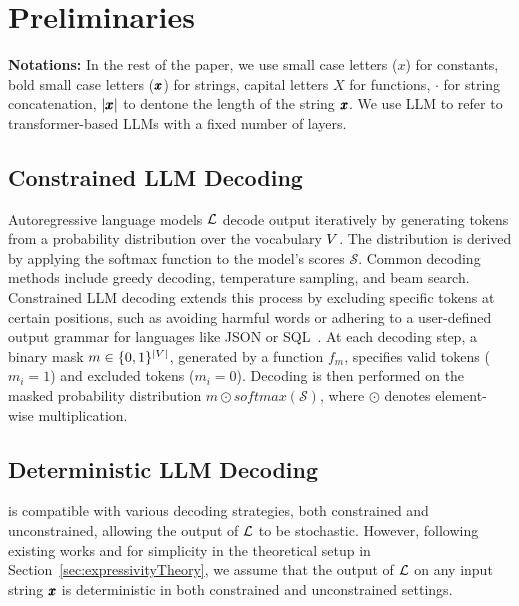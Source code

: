 \vspace{-9pt}
\section{Preliminaries}
\label{sec:prelims}
\textbf{Notations:} In the rest of the paper, we use small case letters ($x$) for constants, bold small case letters ($\pmb{x}$) for strings, capital letters $X$ for functions, $\cdot$ for string concatenation, $|\pmb{x}|$ to dentone the length of the string $\pmb{x}$. 
We use LLM to refer to transformer-based LLMs with a fixed number of layers. 
\subsection{Constrained LLM Decoding}
Autoregressive language models $\mathcal{L}{}$ decode output iteratively by generating tokens from a probability distribution over the vocabulary $V$. The distribution is derived by applying the softmax function to the model's scores $\mathcal{S}$. 
Common decoding methods include greedy decoding, temperature sampling, and beam search.
Constrained LLM decoding extends this process by excluding specific tokens at certain positions, such as avoiding harmful words or adhering to a user-defined output grammar for languages like JSON or SQL~\cite{poesia2022synchromesh, ugare2024syncodellmgenerationgrammar, willard2023efficient}. 
At each decoding step, a binary mask $m \in \{0, 1\}^{|V|}$, generated by a function $f_m$, specifies valid tokens ($m_i = 1$) and excluded tokens ($m_i = 0$). 
Decoding is then performed on the masked probability distribution $m \odot \textit{softmax}(\mathcal{S})$, where $\odot$ denotes element-wise multiplication. 

\subsection{Deterministic LLM Decoding}
\Tool is compatible with various decoding strategies, both constrained and unconstrained, allowing the output of \(\mathcal{L}{}\) to be stochastic. 
However, following existing works \cite{circuit1, tc0, expressivity2} and for simplicity in the theoretical setup in Section~\ref{sec:expressivityTheory}, we assume that the output of \(\mathcal{L}\) on any input string \(\pmb{x}\) is deterministic in both constrained and unconstrained settings.

